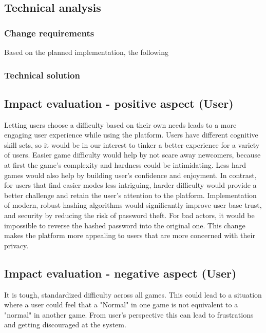 \documentclass[11pt,a4paper]{article}
\begin{document}
\begin{comment}
    kaip ir done????
\end{comment}

\subsection{Technical analysis}
\subsubsection{Change requirements}
Based on the planned implementation, the following
\subsubsection{Technical solution}

\subsection{Impact evaluation - positive aspect (User)}
Letting users choose a difficulty based on their own needs leads to a more engaging user experience while using the platform. Users have different cognitive skill sets, so it would be in our interest to tinker a better experience for a variety of users. Easier game difficulty would help by not scare away newcomers, because at first the game's complexity and hardness could be intimidating. Less hard games would also help by building user's confidence and enjoyment. In contrast, for users that find easier modes less intriguing, harder difficulty would provide a better challenge and retain the user's attention to the platform.
Implementation of modern, robust hashing algorithms would significantly improve user base trust, and security by reducing the risk of password theft. For bad actors, it would be impossible to reverse the hashed password into the original one. This change makes the platform more appealing to users that are more concerned with their privacy.

\subsection{Impact evaluation - negative aspect (User)}
It is tough, standardized difficulty across all games. This could lead to a situation where a user could feel that a "Normal" in one game is not equivalent to a "normal" in another game. From user's perspective this can lead to frustrations and getting discouraged at the system.
\end{document}
